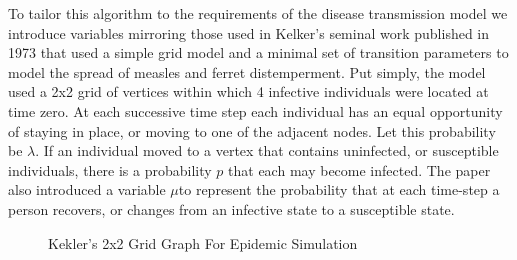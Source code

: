 {\begin{algorithm}[H]
\begin{algorithmic}[1]
    \EndFor
         
    \EndFor
\EndWhile
{}
    \State {}    
\EndIf
{}
\end{algorithmic}
\end{algorithm}

To tailor this algorithm to the requirements of the disease transmission model we introduce variables mirroring those used in Kelker's seminal work\cite{Kelker1973} published in 1973 that used a simple grid model and a minimal set of transition parameters to model the spread of measles and ferret distemperment. Put simply, the model used a 2x2 grid of vertices within which 4 infective individuals were located at time zero. At each successive time step each individual has an equal opportunity of staying in place, or moving to one of the adjacent nodes. Let this probability be $\lambda$. If an individual moved to a vertex that contains uninfected, or susceptible individuals, there is a probability $p$ that each may become infected. The paper also introduced a variable $\mu$to represent the probability that at each time-step a person recovers, or changes from an infective state to a susceptible state.

\begin{figure}[h]
\centering
{}   
\caption{Kekler's 2x2 Grid Graph For Epidemic Simulation \cite{Kelker1973}}
\end{figure}

}
